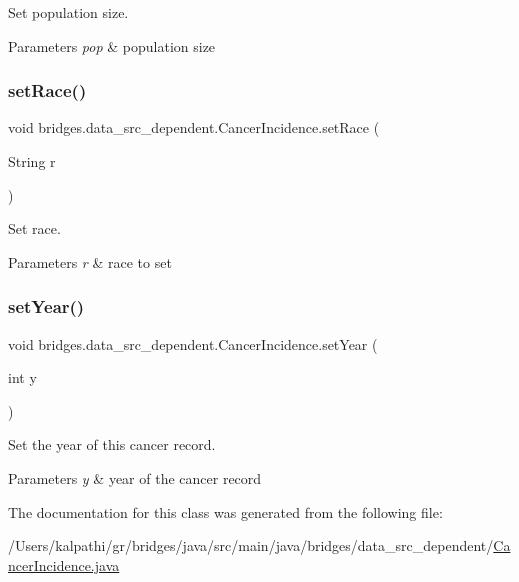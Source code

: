Set population size. 


\begin{DoxyParams}{Parameters}
{\em pop} & population size \\
\hline
\end{DoxyParams}
\mbox{\label{classbridges_1_1data__src__dependent_1_1_cancer_incidence_a8c26c4358561453f3d2ca3a463eed872}} 
\subsubsection{\texorpdfstring{setRace()}{setRace()}}
{\footnotesize\ttfamily void bridges.\+data\+\_\+src\+\_\+dependent.\+Cancer\+Incidence.\+set\+Race (\begin{DoxyParamCaption}\item[{String}]{r }\end{DoxyParamCaption})}



Set race. 


\begin{DoxyParams}{Parameters}
{\em r} & race to set \\
\hline
\end{DoxyParams}
\mbox{\label{classbridges_1_1data__src__dependent_1_1_cancer_incidence_aa5524736b76d67f1248d1a05d9f596a9}} 
\subsubsection{\texorpdfstring{setYear()}{setYear()}}
{\footnotesize\ttfamily void bridges.\+data\+\_\+src\+\_\+dependent.\+Cancer\+Incidence.\+set\+Year (\begin{DoxyParamCaption}\item[{int}]{y }\end{DoxyParamCaption})}



Set the year of this cancer record. 


\begin{DoxyParams}{Parameters}
{\em y} & year of the cancer record \\
\hline
\end{DoxyParams}


The documentation for this class was generated from the following file\+:\begin{DoxyCompactItemize}
\item 
/\+Users/kalpathi/gr/bridges/java/src/main/java/bridges/data\+\_\+src\+\_\+dependent/\mbox{\hyperlink{_cancer_incidence_8java}{Cancer\+Incidence.\+java}}\end{DoxyCompactItemize}
